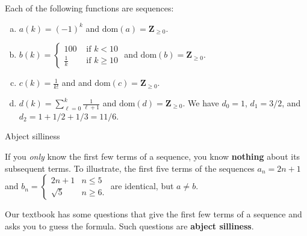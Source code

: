 \documentclass[portrait,fleqn,12pt]{beamer}
\newcommand{\dom}{\mbox{dom}}
\newenvironment{alphalist}
   {\begin{enumerate}[(a)]
       \addtolength{\itemsep}{-1.25\itemsep}}
     {\end{enumerate}}
\newcommand{\integers}{\mathbf{Z}}
\begin{document}
\begin{frame}

\begin{example} Each of the following functions are sequences:

\begin{alphalist}
\item \(a(k)  = (-1)^k \) and $\dom(a)=\integers_{\geq 0}$.

\item \(\displaystyle b(k) = \begin{cases} 100 & \mbox{ if } k <
    10 \\ \frac{1}{k} & \mbox{ if } k \geq 10 \end{cases} \)  and $\dom(b)=\integers_{\geq 0}$.

\item  \(\displaystyle c(k) = \frac{1}{k!} \) and  and $\dom(c)=\integers_{\geq 0}$. 

\item  \(\displaystyle d(k)  = \sum_{\ell=0}^k \frac{1}{\ell+1}\) and  $\dom(d)=\integers_{\geq 0}$. We have
\(d_0 = 1\), \(d_1 = 3/2\), and \(d_2 = 1+1/2 + 1/3 = 11/6\).


\end{alphalist}
\end{example}

\end{frame}
\begin{frame}{Abject silliness}


If you \emph{only} know the first few terms of a sequence, you know
\textbf{nothing} about its subsequent terms. To illustrate, the first five
terms of the sequences
\(
  a_n = 2 n + 1
\)
and
\(
  b_n = \begin{cases} 2 n +1 & n \leq 5 \\  \sqrt{5} & n \geq 6. \end{cases}
\)
are identical, but \(a \neq b\). 

Our textbook has some questions that give the first few terms of a sequence and
asks you to guess the formula. Such questions are \textbf{abject silliness}.

\end{frame}
\end{document}
